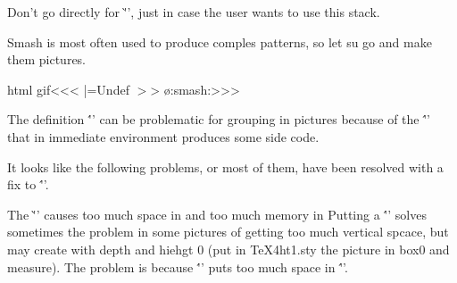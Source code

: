 {{{{Don't go directly for \`'\PushMacro\EndPicture', just in case the
user wants to use this stack.  

Smash is most often used to produce comples patterns, so
let su go and make them pictures.

\<html gif\><<<
\def\:temp#1{\ifx \EndPicture\:Undef
      \relax\ifmmode\hbox{$#1$}\else \hbox{#1}\fi
   \else \o:smash:{#1}\fi}
\HLet\smash|=\:temp
>>>



The definition \''\def\HCode#1{\leavevmode\special{t4ht=#1}}' can be
problematic for grouping in pictures because of the \''\leavevmode'
that in immediate environment produces some side code.


It looks like the following problems, or most
of them, have been resolved with a fix to \''\noalign'.


The \`'' causes too much space in 
%
\fi
%
and too much memory in 
%
\fi
%
Putting a \''\offinterlineskip' solves sometimes the problem
in some pictures of getting too much vertical
spcace, but may create 
\fi{} with depth and hiehgt 0 (put 
in TeX4ht1.sty the picture in box0 and measure). The problem
is because \''\def\offinterlineskip{\baselineskip-1000\p@
  \lineskip\z@ \lineskiplimit\maxdimen}' puts too much space
in \''\lineskiplimit'.



}}}}
